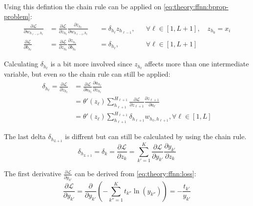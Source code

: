 Using this defintion the chain rule can be applied on \eqref{eq:theory:ffnn:bprop-problem}:
\begin{equation}
\begin{align}
\frac{\partial \mathcal{L}}{\partial w_{h_{\ell-1}, h_\ell}} &= \frac{\partial \mathcal{L}}{\partial z_{h_\ell}} \frac{\partial z_{h_\ell}}{\partial w_{h_{\ell-1}, h_\ell}} &&= \delta_{h_\ell} z_{h_{\ell-1}},&& \forall \ell \in [1, L+1],\quad z_{h_0} = x_i \\
\frac{\partial \mathcal{L}}{\partial b_{h_\ell}} &= \frac{\partial \mathcal{L}}{\partial z_{h_\ell}} \frac{\partial z_{h_\ell}}{\partial b_{h_\ell}} &&= \delta_{h_\ell},&& \forall \ell \in [1, L+1]
\end{align}
\end{equation}


Calculating $\delta_{h_\ell}$ is a bit more involved since $z_{h_\ell}$ affects more than one intermediate variable, but even so the chain rule can still be applied:
\begin{equation}
\begin{aligned}
\delta_{h_\ell} = \frac{\partial \mathcal{L}}{\partial z_{h_\ell}} &= \frac{\partial \mathcal{L}}{\partial a_{h_\ell}} \frac{\partial a_{h_\ell}}{\partial z_{h_\ell}} \\
&= \theta'(z_\ell) \sum_{h_{\ell+1}}^{H_{\ell+1}} \frac{\partial \mathcal{L}}{\partial z_{\ell+1}} \frac{\partial z_{\ell+1}}{\partial a_\ell} \\
&= \theta'(z_\ell) \sum_{h_{\ell+1}}^{H_{\ell+1}} \delta_{h_{\ell+1}} w_{h_\ell, h_{\ell+1}}, \forall \ell \in [1, L]
\end{aligned}
\label{eq:theory:ffnn:bprop}
\end{equation}

The last delta $\delta_{h_{L+1}}$ is diffrent but can still be calculated by using the chain rule.
\begin{equation}
\delta_{h_{L + 1}} = \delta_k = \frac{\partial \mathcal{L}}{\partial z_k} = \sum_{k'=1}^K \frac{\partial \mathcal{L}}{\partial y_{k'}} \frac{\partial y_{k'}}{\partial z_k}
\label{eq:theory:ffnn:bprop-deltaK}
\end{equation}

The first derivative $\frac{\partial \mathcal{L}}{\partial y_{k'}}$ can be derived from \eqref{eq:theory:ffnn:loss}:
\begin{equation}
\frac{\partial \mathcal{L}}{\partial y_{k'}} = \frac{\partial}{\partial y_{k'}} \left(- \sum_{k''=1}^K t_{k''} \ln(y_{k''})\right) = -\frac{t_{k'}}{y_{k'}}
\label{eq:theory:ffnn:bprop-Ldy}
\end{equation}

